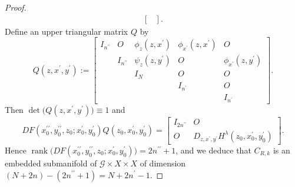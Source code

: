 \documentclass[a4paper,11pt,reqno]{amsart}
\theoremstyle{definition}
\theoremstyle{remark}
\begin{document}
\begin{proof}
\begin{align*}
\begin{bmatrix}
  \end{bmatrix}. 
\end{align*}
%
%
Define an upper triangular matrix $Q$ by 
%
%
$$
Q(z,x^\prime,y^\prime)
:=
\begin{bmatrix}
I_{n^{\prime\prime}} & O & \phi_z(z,x^\prime) & \phi_{x^\prime}(z,x^\prime) & O 
\\
  & I_{n^{\prime\prime}} & \psi_z(z,y^\prime) & O & \phi_{x^\prime}(z,y^\prime) 
\\
  &                      & I_N                & O            & O
\\
  &                      &                    & I_{n^\prime} & O
\\
  &                      &                    &              & I_{n^\prime}
\end{bmatrix}.
$$
%
%
Then $\operatorname{det}\bigl(Q(z,x^\prime,y^\prime)\bigr)\equiv1$ and 
%
%
$$
DF(x_0^{\prime\prime},y_0^{\prime\prime},z_0;x_0^\prime,y_0^\prime)
Q(z_0,x_0^\prime,y_0^\prime)
=
\begin{bmatrix}
I_{2n^{\prime\prime}} & O
\\
O & D_{z,x^\prime,y^\prime}H^\lambda(z_0,x_0^\prime,y_0^\prime) 
\end{bmatrix}. 
$$
%
%
Hence $\operatorname{rank}\bigl(DF(x_0^{\prime\prime},y_0^{\prime\prime},z_0;x_0^\prime,y_0^\prime)\bigr)=2n^{\prime\prime}+1$, and we deduce that $C_{R,k}$ is an embedded 
submanifold of $\mathcal{G} \times X \times X$ of dimension 
$(N+2n)-(2n^{\prime\prime}+1)=N+2n^\prime-1$. 
\end{proof}
%
%
\end{document}

